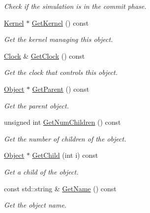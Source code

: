 \begin{DoxyCompactItemize}
\begin{DoxyCompactList}\small\item\em Check if the simulation is in the commit phase. \end{DoxyCompactList}\item 
\hyperlink{class_simulator_1_1_kernel}{Kernel} $\ast$ \hyperlink{class_simulator_1_1_object_a922b748314bbdd22ba74c0e8dec37919}{Get\+Kernel} () const 
\begin{DoxyCompactList}\small\item\em Get the kernel managing this object. \end{DoxyCompactList}\item 
\hyperlink{class_simulator_1_1_clock}{Clock} \& \hyperlink{class_simulator_1_1_object_ad48b88b20a4e875c02c73666fd617afb}{Get\+Clock} () const 
\begin{DoxyCompactList}\small\item\em Get the clock that controls this object. \end{DoxyCompactList}\item 
\hyperlink{class_simulator_1_1_object}{Object} $\ast$ \hyperlink{class_simulator_1_1_object_ab89deb8f967761fa70a7342d4f4b592e}{Get\+Parent} () const 
\begin{DoxyCompactList}\small\item\em Get the parent object. \end{DoxyCompactList}\item 
unsigned int \hyperlink{class_simulator_1_1_object_abe6304f064839ba240789572daf3368e}{Get\+Num\+Children} () const 
\begin{DoxyCompactList}\small\item\em Get the number of children of the object. \end{DoxyCompactList}\item 
\hyperlink{class_simulator_1_1_object}{Object} $\ast$ \hyperlink{class_simulator_1_1_object_a1eff5a7c64a9bf63dd8079ea16662cd3}{Get\+Child} (int i) const 
\begin{DoxyCompactList}\small\item\em Get a child of the object. \end{DoxyCompactList}\item 
const std\+::string \& \hyperlink{class_simulator_1_1_object_a79b8ce82b705074e5c78c4baa1e9dfaa}{Get\+Name} () const 
\begin{DoxyCompactList}\small\item\em Get the object name. \end{DoxyCompactList}\item 

\end{DoxyCompactItemize}
